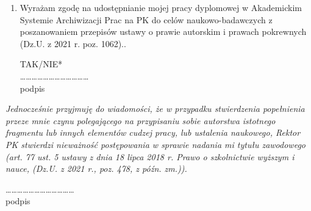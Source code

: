 \begin{small}
\begin{enumerate}
\item Wyrażam zgodę na udostępnianie mojej pracy dyplomowej w Akademickim Systemie Archiwizacji Prac na PK do celów naukowo-badawczych z poszanowaniem przepisów ustawy o prawie autorskim i prawach pokrewnych (Dz.U. z 2021 r. poz. 1062)..

 
\begin{flushright}
TAK/NIE* \\
………………………………\\
podpis
\end{flushright}

\newpage

\end{enumerate}
\textit{Jednocześnie przyjmuję do wiadomości, że w przypadku stwierdzenia popełnienia przeze mnie czynu polegającego na przypisaniu sobie autorstwa istotnego fragmentu lub innych elementów cudzej pracy, lub ustalenia naukowego, Rektor PK stwierdzi nieważność postępowania w sprawie nadania mi tytułu zawodowego (art. 77 ust. 5 ustawy z dnia 18 lipca 2018 r. Prawo o szkolnictwie wyższym i nauce, (Dz.U. z 2021 r., poz. 478, z późn. zm.)).}

\begin{flushright}
……………………………… \\
podpis
\end{flushright}
\end{small}

\endgroup